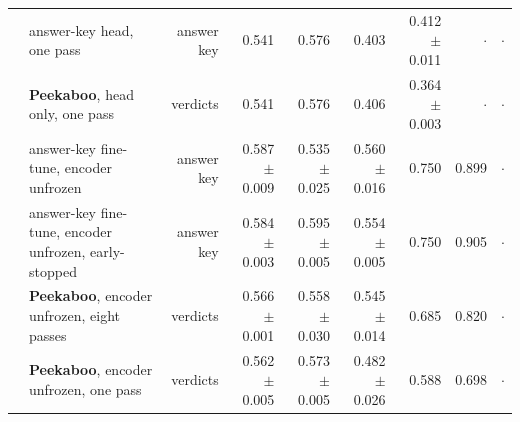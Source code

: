 \begin{table}[tbp]
{\begin{tabular}{llrrrrrrr}
 & answer-key head, one pass & answer key & 0.541 & 0.576 & 0.403 & 0.412 {\scriptsize$\pm$0.011} & $\cdot$ & $\cdot$ \\
 & \textbf{Peekaboo}, head only, one pass & verdicts & 0.541 & 0.576 & 0.406 & 0.364 {\scriptsize$\pm$0.003} & $\cdot$ & $\cdot$ \\
 & answer-key fine-tune, encoder unfrozen & answer key & 0.587 {\scriptsize$\pm$0.009} & 0.535 {\scriptsize$\pm$0.025} & 0.560 {\scriptsize$\pm$0.016} & 0.750 & 0.899 & $\cdot$ \\
 & answer-key fine-tune, encoder unfrozen, early-stopped & answer key & 0.584 {\scriptsize$\pm$0.003} & 0.595 {\scriptsize$\pm$0.005} & 0.554 {\scriptsize$\pm$0.005} & 0.750 & 0.905 & $\cdot$ \\
 & \textbf{Peekaboo}, encoder unfrozen, eight passes & verdicts & 0.566 {\scriptsize$\pm$0.001} & 0.558 {\scriptsize$\pm$0.030} & 0.545 {\scriptsize$\pm$0.014} & 0.685 & 0.820 & $\cdot$ \\
 & \textbf{Peekaboo}, encoder unfrozen, one pass & verdicts & 0.562 {\scriptsize$\pm$0.005} & 0.573 {\scriptsize$\pm$0.005} & 0.482 {\scriptsize$\pm$0.026} & 0.588 & 0.698 & $\cdot$ \\
\bottomrule
\end{tabular}}
\end{table}
